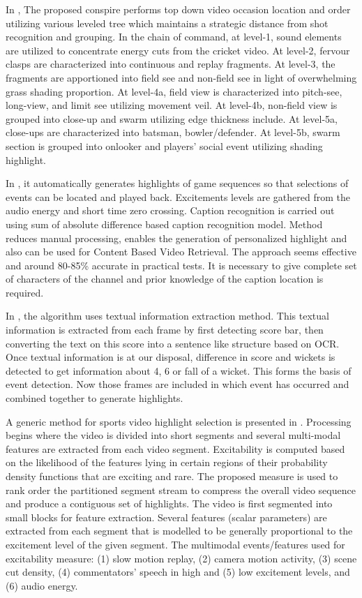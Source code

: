 In \cite{4756096}, The proposed conspire performs top down video occasion location and order utilizing various leveled tree which maintains a strategic distance from shot recognition and grouping. In the chain of command, at level-1, sound elements are utilized to concentrate energy cuts from the cricket video. At level-2, fervour clasps are characterized into continuous and replay fragments. At level-3, the fragments are apportioned into field see and non-field see in light of overwhelming grass shading proportion. At level-4a, field view is characterized into pitch-see, long-view, and limit see utilizing movement veil. At level-4b, non-field view is grouped into close-up and swarm utilizing edge thickness include. At level-5a, close-ups are characterized into batsman, bowler/defender. At level-5b, swarm section is grouped into onlooker and players' social event utilizing shading highlight.

In \cite{canalysis} , it automatically generates highlights of game sequences so that selections of events can be located and played back. Excitements levels are gathered from the audio energy and short time zero crossing. Caption recognition is carried out using sum of absolute difference based caption recognition model. Method reduces manual processing, enables the generation of personalized highlight and also can be used for Content Based Video Retrieval. The approach seems effective and around 80-85\% accurate in practical tests. It is necessary to give complete set of characters of the channel and prior knowledge of the caption location is required. 
	
In \cite{6731340}, the algorithm uses textual information extraction method. This textual information is extracted from each frame by first detecting score bar, then converting the text on this score into a sentence like structure based on OCR. Once textual information is at our disposal, difference in score and wickets is detected to get information about 4, 6 or fall of a wicket. This forms the basis of event detection. Now those frames are included in which event has occurred and combined together to generate highlights.

A generic method for sports video highlight selection is presented in \cite{Hasan2013}. Processing begins where the video is divided into short segments and several multi-modal features are extracted from each video segment. Excitability is computed based on the likelihood of the features lying in certain regions of their probability density functions that are exciting and rare. The proposed measure is used to rank order the partitioned segment stream to compress the overall video sequence and produce a contiguous set of highlights. The video is first segmented into small blocks for feature extraction. Several features (scalar parameters) are extracted from each segment that is modelled to be generally proportional to the excitement level of the given segment. The multimodal events/features used for excitability measure: (1) slow motion replay, (2) camera motion activity, (3) scene cut density, (4) commentators’ speech in high and (5) low excitement levels, and (6) audio energy.

